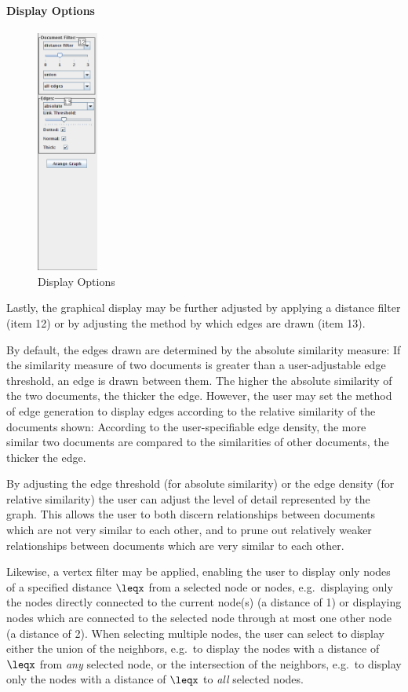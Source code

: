 \paragraph{Display Options}

\begin{figure}[h]
\centering
\caption{Display Options}
\includegraphics[height=80mm]{displayopts.png}
\end{figure}

Lastly, the graphical display may be further adjusted by applying a distance filter (item 12) or by adjusting the method by which edges are drawn (item 13).

By default, the edges drawn are determined by the absolute similarity measure: If the similarity measure of two documents is greater than a user-adjustable edge threshold, an edge is drawn between them. The higher the absolute similarity of the two documents, the thicker the edge. However, the user may set the method of edge generation to display edges according to the relative similarity of the documents shown: According to the user-specifiable edge density, the more similar two documents are compared to the similarities of other documents, the thicker the edge.

By adjusting the edge threshold (for absolute similarity) or the edge density (for relative similarity) the user can adjust the level of detail represented by the graph. This allows the user to both discern relationships between documents which are not very similar to each other, and to prune out relatively weaker relationships between documents which are very similar to each other.

Likewise, a vertex filter may be applied, enabling the user to display only nodes of a specified distance $\leqx$ from a selected node or nodes, e.g.\ displaying only the nodes directly connected to the current node(s) (a distance of 1) or displaying nodes which are connected to the selected node through at most one other node (a distance of 2). When selecting multiple nodes, the user can select to display either the union of the neighbors, e.g.\ to display the nodes with a distance of $\leqx$ from \emph{any} selected node, or the intersection of the neighbors, e.g.\ to display only the nodes with a distance of $\leqx$ to \emph{all} selected nodes.

